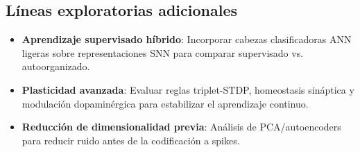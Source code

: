 \subsection{Líneas exploratorias adicionales}
\begin{itemize}
    \item \textbf{Aprendizaje supervisado híbrido}: Incorporar cabezas clasificadoras ANN ligeras sobre representaciones SNN para comparar supervisado vs. autoorganizado.
    \item \textbf{Plasticidad avanzada}: Evaluar reglas triplet-STDP, homeostasis sináptica y modulación dopaminérgica para estabilizar el aprendizaje continuo.
    \item \textbf{Reducción de dimensionalidad previa}: Análisis de PCA/autoencoders para reducir ruido antes de la codificación a spikes.
\end{itemize}
